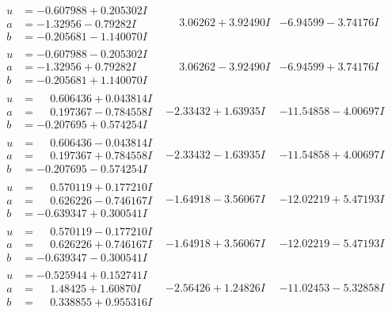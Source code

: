 \documentclass[1p]{elsarticle_modified}
\theoremstyle{definition}
\begin{document}
$$\begin{array}{c|c|c}
\begin{aligned}
u &= -0.607988 + 0.205302 I \\
a &= -1.32956 - 0.79282 I \\
b &= -0.205681 - 1.140070 I\end{aligned}
 & \phantom{-}3.06262 + 3.92490 I & -6.94599 - 3.74176 I \\ \hline\begin{aligned}
u &= -0.607988 - 0.205302 I \\
a &= -1.32956 + 0.79282 I \\
b &= -0.205681 + 1.140070 I\end{aligned}
 & \phantom{-}3.06262 - 3.92490 I & -6.94599 + 3.74176 I \\ \hline\begin{aligned}
u &= \phantom{-}0.606436 + 0.043814 I \\
a &= \phantom{-}0.197367 - 0.784558 I \\
b &= -0.207695 + 0.574254 I\end{aligned}
 & -2.33432 + 1.63935 I & -11.54858 - 4.00697 I \\ \hline\begin{aligned}
u &= \phantom{-}0.606436 - 0.043814 I \\
a &= \phantom{-}0.197367 + 0.784558 I \\
b &= -0.207695 - 0.574254 I\end{aligned}
 & -2.33432 - 1.63935 I & -11.54858 + 4.00697 I \\ \hline\begin{aligned}
u &= \phantom{-}0.570119 + 0.177210 I \\
a &= \phantom{-}0.626226 - 0.746167 I \\
b &= -0.639347 + 0.300541 I\end{aligned}
 & -1.64918 - 3.56067 I & -12.02219 + 5.47193 I \\ \hline\begin{aligned}
u &= \phantom{-}0.570119 - 0.177210 I \\
a &= \phantom{-}0.626226 + 0.746167 I \\
b &= -0.639347 - 0.300541 I\end{aligned}
 & -1.64918 + 3.56067 I & -12.02219 - 5.47193 I \\ \hline\begin{aligned}
u &= -0.525944 + 0.152741 I \\
a &= \phantom{-}1.48425 + 1.60870 I \\
b &= \phantom{-}0.338855 + 0.955316 I\end{aligned}
 & -2.56426 + 1.24826 I & -11.02453 - 5.32858 I \\ \hline\begin{aligned}

\end{aligned}
\end{array}$$
\end{document}
